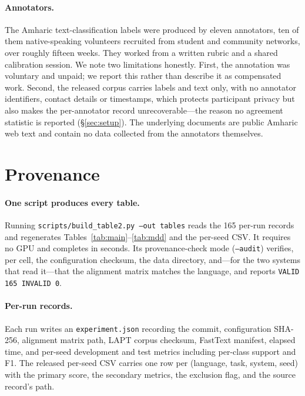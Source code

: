 \documentclass[11pt]{article}
\begin{document}
\paragraph{Annotators.} The Amharic text-classification labels were produced
by eleven annotators, ten of them native-speaking volunteers recruited from
student and community networks, over roughly fifteen weeks. They worked from
a written rubric and a shared calibration session. We note two limitations
honestly. First, the annotation was voluntary and unpaid; we report this
rather than describe it as compensated work. Second, the released corpus
carries labels and text only, with no annotator identifiers, contact details
or timestamps, which protects participant privacy but also makes the
per-annotator record unrecoverable---the reason no agreement statistic is
reported (\S\ref{sec:setup}). The underlying documents are public Amharic web
text and contain no data collected from the annotators themselves.



\appendix

\section{Provenance}
\label{app:provenance}

\paragraph{One script produces every table.} Running
\texttt{scripts/build\_table2.py --out tables} reads the 165 per-run records
and regenerates Tables~\ref{tab:main}--\ref{tab:mdd} and the per-seed CSV. It
requires no GPU and completes in seconds. Its provenance-check mode
(\texttt{--audit}) verifies, per cell, the configuration checksum, the data
directory, and---for the two systems that read it---that the alignment matrix
matches the language, and reports \texttt{VALID 165 INVALID 0}.

\paragraph{Per-run records.} Each run writes an \texttt{experiment.json}
recording the commit, configuration SHA-256, alignment matrix path, LAPT
corpus checksum, FastText manifest, elapsed time, and per-seed development
and test metrics including per-class support and F1. The released per-seed
CSV carries one row per (language, task, system, seed) with the primary
score, the secondary metrics, the exclusion flag, and the source record's
path.
\end{document}
